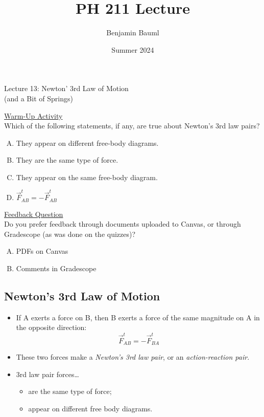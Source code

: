\documentclass[]{article}
\title{PH 211 Lecture \Week}
\author{Benjamin Bauml}
\date{Summer 2024}
\newcommand{\Week}{13}
\begin{document}
\begin{TeacherMargin}

\end{TeacherMargin}
\begin{PresentSpace}
\begin{center}
	\huge Lecture \Week: Newton' 3rd Law of Motion \\
	\small (and a Bit of Springs)
\end{center}
\vspace{0.5cm}
\underline{Warm-Up Activity} \\
Which of the following statements, if any, are true about Newton's 3rd law pairs?
\begin{enumerate}[(A)]
	\item They appear on different free-body diagrams.
	\item They are the same type of force.
	\item They appear on the same free-body diagram.
	\item $\vec{F}^{t}_{AB} = -\vec{F}^{t}_{AB}$
\end{enumerate}
\vspace{1cm}
\underline{Feedback Question} \\
Do you prefer feedback through documents uploaded to Canvas, or through Gradescope (as was done on the quizzes)?
\begin{enumerate}[(A)]
	\item PDFs on Canvas
	\item Comments in Gradescope
\end{enumerate}
\end{PresentSpace}
\newpage
\begin{TeacherMargin}

\end{TeacherMargin}
\begin{PresentSpace}
\vspace{-10pt}
\section*{Newton's 3rd Law of Motion}
\vspace{-10pt}
\begin{itemize}
	\item If A exerts a force on B, then B exerts a force of the same magnitude on A in the opposite direction:
	\[
	\vec{F}^{t}_{AB} = -\vec{F}^{t}_{BA}
	\]
	\item These two forces make a \textit{Newton's 3rd law pair}, or an \textit{action-reaction pair}.
	\item 3rd law pair forces\dots
	\begin{itemize}
		\item are the same type of force;
		\item appear on different free body diagrams.
	\end{itemize}
\end{itemize}
\end{PresentSpace}
\end{document}
